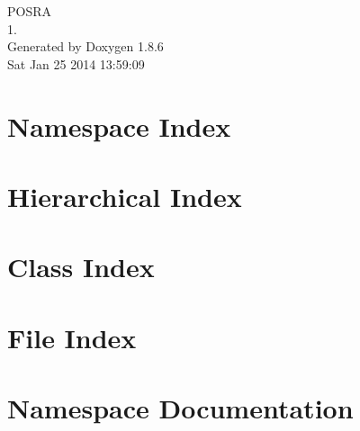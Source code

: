 \documentclass[twoside]{book}
\newcommand{\clearemptydoublepage}{%
  \newpage{\pagestyle{empty}\cleardoublepage}%
}
\begin{document}
\hypersetup{pageanchor=false}
\begin{titlepage}
\vspace*{7cm}
\begin{center}%
{\Large P\-O\-S\-R\-A \\[1ex]\large 1. }\\
\vspace*{1cm}
{\large Generated by Doxygen 1.8.6}\\
\vspace*{0.5cm}
{\small Sat Jan 25 2014 13:59:09}\\
\end{center}
\end{titlepage}
\clearemptydoublepage
\tableofcontents
\clearemptydoublepage
{}
\hypersetup{pageanchor=true}

\chapter{Namespace Index}

\chapter{Hierarchical Index}

\chapter{Class Index}

\chapter{File Index}

\chapter{Namespace Documentation}


\end{document}
